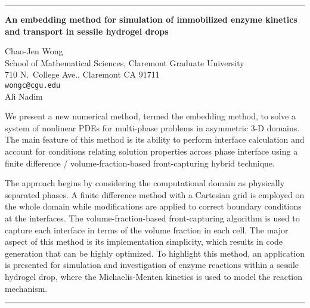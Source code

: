 \documentclass[twosided]{report}
\begin{document}
	\begin{center} \rule{6in}{1pt} \end{center}

\begin{center}
{\large			%
{\bf An embedding method for simulation of immobilized enzyme kinetics \\
	and transport in sessile hydrogel drops}}

	Chao-Jen Wong \\
	School of Mathematical Sciences, Claremont Graduate University \\
	710 N.~College Ave., Claremont CA 91711 \\
	{\tt wongc@cgu.edu} \\
	Ali Nadim
\end{center}
We
present a new numerical method, termed the embedding method,
to solve a system of nonlinear PDEs for multi-phase problems
in asymmetric 3-D domains. The main feature of this method
is its ability to perform interface calculation and account
for conditions relating solution properties across phase
interface using a finite difference / volume-fraction-based
front-capturing hybrid technique.

The approach begins by
considering the computational domain as physically separated
phases. A finite difference method with a Cartesian grid is
employed on the whole domain while modifications are applied
to correct boundary conditions at the interfaces. The
volume-fraction-based front-capturing algorithm is used to
capture each interface in terms of the volume fraction in
each cell. The major aspect of this method is its
implementation simplicity, which results in code generation
that can be highly optimized. To highlight this method, an
application is presented for simulation and investigation of
enzyme reactions within a sessile hydrogel drop, where the
Michaelis-Menten kinetics is used to model the reaction
mechanism.



	\begin{center} \rule{6in}{1pt} \end{center}
\end{document}
